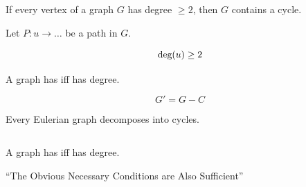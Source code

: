 \begin{frame}{}
  \begin{lemma}
    If every vertex of a graph $G$ has degree $\ge 2$,
    then $G$ contains a cycle.
  \end{lemma}

  \pause
  \vspace{0.30cm}
  \begin{center}
    \pause
    \vspace{0.50cm}

    Let $P: u \to \dots$ be a  path in $G$.

    \pause
    \[
      \text{deg}(u) \ge 2
    \]
  \end{center}
\end{frame}

\begin{frame}{}
  \begin{theorem}
    A  graph has  iff
     has  degree.
  \end{theorem}

  \pause
  \vspace{0.30cm}
  \begin{center}

    \pause
    \vspace{0.30cm}
    \[
      G' = G - C
    \]
  \end{center}
\end{frame}

\begin{frame}{}
  \begin{theorem}{}
    Every Eulerian graph decomposes into cycles.
  \end{theorem}

  \vspace{1em}
  \begin{columns}
  \end{columns}
\end{frame}

\begin{frame}{}
  \begin{theorem}
    A  graph has  iff
     has  degree.
  \end{theorem}

  \vspace{2em}
  \begin{center}

    \vspace{1em}
    ``The Obvious Necessary Conditions are Also Sufficient''
  \end{center}
\end{frame}
